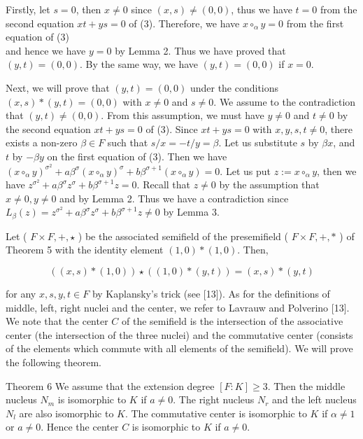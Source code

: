 \documentclass[10pt]{article}
\begin{document}
Firstly, let $s=0$, then $x \neq 0$ since $(x, s) \neq(0,0)$, thus we have $t=0$ from the second equation $x t+y s=0$ of (3). Therefore, we have $x \circ_{\alpha} y=0$ from the first equation of (3)\\
and hence we have $y=0$ by Lemma 2. Thus we have proved that $(y, t)=(0,0)$. By the same way, we have $(y, t)=(0,0)$ if $x=0$.

Next, we will prove that $(y, t)=(0,0)$ under the conditions $(x, s) *(y, t)=(0,0)$ with $x \neq 0$ and $s \neq 0$. We assume to the contradiction that $(y, t) \neq(0,0)$. From this assumption, we must have $y \neq 0$ and $t \neq 0$ by the second equation $x t+y s=0$ of (3). Since $x t+y s=0$ with $x, y, s, t \neq 0$, there exists a non-zero $\beta \in F$ such that $s / x=-t / y=\beta$. Let us substitute $s$ by $\beta x$, and $t$ by $-\beta y$ on the first equation of (3). Then we have $\left(x \circ_{\alpha} y\right)^{\sigma^{2}}+a \beta^{\sigma}\left(x \circ_{\alpha} y\right)^{\sigma}+b \beta^{\sigma+1}\left(x \circ_{\alpha} y\right)=0$. Let us put $z:=x \circ_{\alpha} y$, then we have $z^{\sigma^{2}}+a \beta^{\sigma} z^{\sigma}+b \beta^{\sigma+1} z=0$. Recall that $z \neq 0$ by the assumption that $x \neq 0, y \neq 0$ and by Lemma 2. Thus we have a contradiction since $L_{\beta}(z)=z^{\sigma^{2}}+a \beta^{\sigma} z^{\sigma}+b \beta^{\sigma+1} z \neq 0$ by Lemma 3.

Let ( $F \times F,+, \star$ ) be the associated semifield of the presemifield ( $F \times F,+, *$ ) of Theorem 5 with the identity element $(1,0) *(1,0)$. Then,

$$
((x, s) *(1,0)) \star((1,0) *(y, t))=(x, s) *(y, t)
$$

for any $x, s, y, t \in F$ by Kaplansky's trick (see [13]). As for the definitions of middle, left, right nuclei and the center, we refer to Lavrauw and Polverino [13]. We note that the center $C$ of the semifield is the intersection of the associative center (the intersection of the three nuclei) and the commutative center (consists of the elements which commute with all elements of the semifield). We will prove the following theorem.

Theorem 6 We assume that the extension degree $[F: K] \geq 3$. Then the middle nucleus $N_{m}$ is isomorphic to $K$ if $a \neq 0$. The right nucleus $N_{r}$ and the left nucleus $N_{l}$ are also isomorphic to $K$. The commutative center is isomorphic to $K$ if $\alpha \neq 1$ or $a \neq 0$. Hence the center $C$ is isomorphic to $K$ if $a \neq 0$.
\end{document}
